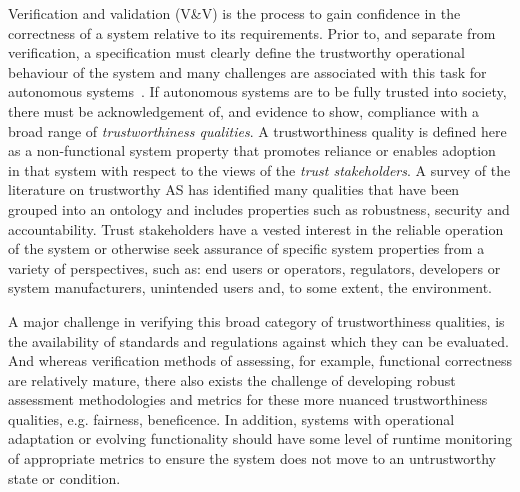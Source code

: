 Verification and validation (V\&V) is the process to gain confidence in the correctness of a system relative to its requirements. Prior to, and separate from verification, a specification must clearly define the trustworthy operational behaviour of the system and many challenges are associated with this task for autonomous systems~\cite{Abeywickrama2022}. 
%
%
If autonomous systems are to be fully trusted into society, there must be acknowledgement of, and evidence to show, compliance with a broad range of \emph{trustworthiness qualities}. 
%
A trustworthiness quality is defined here as a non-functional system property that promotes reliance or enables adoption in that system with respect to the views of the \emph{trust stakeholders}. A survey of the literature on trustworthy AS has identified many qualities that have been grouped into an ontology and includes properties such as robustness, security and accountability. 
%
Trust stakeholders have a vested interest in the reliable operation of the system or otherwise seek assurance of specific system properties from a variety of perspectives, such as: end users or operators, regulators, developers or system manufacturers, unintended users and, to some extent, the environment. 

A major challenge in verifying this broad category of trustworthiness qualities, is the availability of standards and regulations against which they can be evaluated. And whereas verification methods of assessing, for example, functional correctness are relatively mature, there also exists the challenge of developing robust assessment methodologies and metrics for these more nuanced trustworthiness qualities, e.g. fairness, beneficence. 
%
In addition, systems with operational adaptation or evolving functionality should have some level of runtime monitoring of appropriate metrics to ensure the system does not move to an untrustworthy state or condition. 
%

